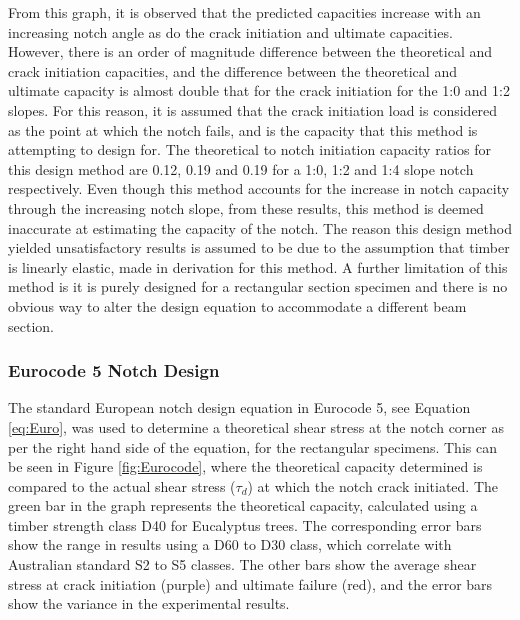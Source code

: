 \documentclass[11pt,a4paper]{article}
\numberwithin{equation}{subsection}
\begin{document}
\vspace*{\baselineskip}

\noindent
From this graph, it is observed that the predicted capacities increase with an increasing notch angle as do the crack initiation and ultimate capacities. However, there is an order of magnitude difference between the theoretical and crack initiation capacities, and the difference between the theoretical and ultimate capacity is almost double that for the crack initiation for the 1:0 and 1:2 slopes. For this reason, it is assumed that the crack initiation load is considered as the point at which the notch fails, and is the capacity that this method is attempting to design for. The theoretical to notch initiation capacity ratios for this design method are 0.12, 0.19 and 0.19 for a 1:0, 1:2 and 1:4 slope notch respectively. Even though this method accounts for the increase in notch capacity through the increasing notch slope, from these results, this method is deemed inaccurate at estimating the capacity of the notch. The reason this design method yielded unsatisfactory results is assumed to be due to the assumption that timber is linearly elastic, made in derivation for this method.  A further limitation of this method is it is purely designed for a rectangular section specimen and there is no obvious way to alter the design equation to accommodate a different beam section.

\subsubsection{Eurocode 5 Notch Design}
The standard European notch design equation in Eurocode 5, see Equation \ref{eq:Euro}, was used to determine a theoretical shear stress at the notch corner as per the right hand side of the equation, for the rectangular specimens. This can be seen in Figure \ref{fig:Eurocode}, where the theoretical capacity determined is compared to the actual shear stress ($\tau_{d}$) at which the notch crack initiated. The green bar in the graph represents the theoretical capacity, calculated using a timber strength class D40 for Eucalyptus trees. The corresponding error bars show the range in results using a D60 to D30 class, which correlate with Australian standard S2 to S5 classes. The other bars show the average shear stress at crack initiation (purple) and ultimate failure (red), and the error bars show the variance in the experimental results. 
\vspace*{\baselineskip}
\end{document}
